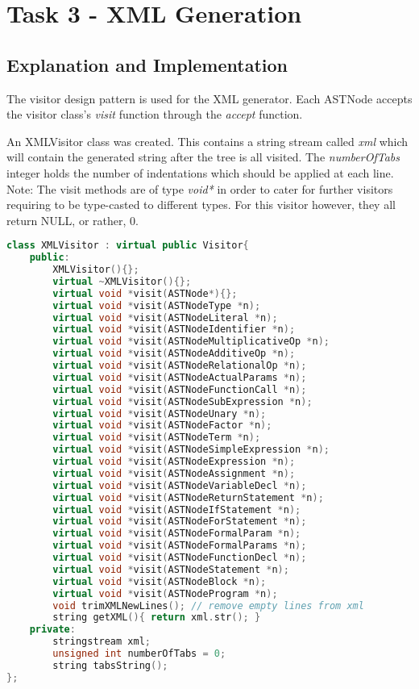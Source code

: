 \section{Task 3 - XML Generation}
\subsection{Explanation and Implementation}

The visitor design pattern is used for the XML generator. Each ASTNode accepts the visitor class's \textit{visit} function through the \textit{accept} function.

An XMLVisitor class was created. This contains a string stream called \textit{xml} which will contain the generated string after the tree is all visited. The \textit{numberOfTabs} integer holds the number of indentations which should be applied at each line. Note: The visit methods are of type \textit{void*} in order to cater for further visitors requiring to be type-casted to different types. For this visitor however, they all return NULL, or rather, 0.

\begin{lstlisting}[language=C++]
class XMLVisitor : virtual public Visitor{
	public:
		XMLVisitor(){};
		virtual ~XMLVisitor(){};
		virtual void *visit(ASTNode*){};
		virtual void *visit(ASTNodeType *n);
		virtual void *visit(ASTNodeLiteral *n);
		virtual void *visit(ASTNodeIdentifier *n);
		virtual void *visit(ASTNodeMultiplicativeOp *n);
		virtual void *visit(ASTNodeAdditiveOp *n);
		virtual void *visit(ASTNodeRelationalOp *n);
		virtual void *visit(ASTNodeActualParams *n);
		virtual void *visit(ASTNodeFunctionCall *n);
		virtual void *visit(ASTNodeSubExpression *n);
		virtual void *visit(ASTNodeUnary *n);
		virtual void *visit(ASTNodeFactor *n);
		virtual void *visit(ASTNodeTerm *n);
		virtual void *visit(ASTNodeSimpleExpression *n);
		virtual void *visit(ASTNodeExpression *n);
		virtual void *visit(ASTNodeAssignment *n);
		virtual void *visit(ASTNodeVariableDecl *n);
		virtual void *visit(ASTNodeReturnStatement *n);
		virtual void *visit(ASTNodeIfStatement *n);
		virtual void *visit(ASTNodeForStatement *n);
		virtual void *visit(ASTNodeFormalParam *n);
		virtual void *visit(ASTNodeFormalParams *n);
		virtual void *visit(ASTNodeFunctionDecl *n);
		virtual void *visit(ASTNodeStatement *n);
		virtual void *visit(ASTNodeBlock *n);
		virtual void *visit(ASTNodeProgram *n);
		void trimXMLNewLines(); // remove empty lines from xml
		string getXML(){ return xml.str(); }
	private:
		stringstream xml;
		unsigned int numberOfTabs = 0;
		string tabsString();
};
\end{lstlisting}

